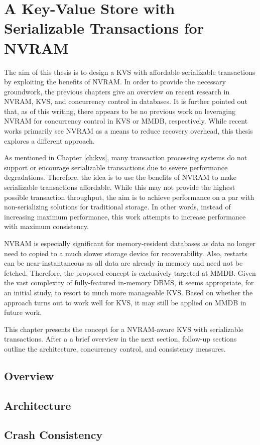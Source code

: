 \chapter{A Key-Value Store with Serializable Transactions for NVRAM}
\label{ch:concept}

The aim of this thesis is to design a KVS with affordable serializable
transactions by exploiting the benefits of NVRAM. In order to provide the
necessary groundwork, the previous chapters give an overview on recent research
in NVRAM, KVS, and concurrency control in databases. It is further pointed out
that, as of this writing, there appears to be no previous work on leveraging
NVRAM for concurrency control in KVS or MMDB, respectively. While recent works
primarily see NVRAM as a means to reduce recovery overhead, this thesis explores
a different approach.

As mentioned in Chapter \ref{ch:kvs}, many transaction processing systems do not
support or encourage serializable transactions due to severe performance
degradations. Therefore, the idea is to use the benefits of NVRAM to make
serializable transactions affordable. While this may not provide the highest
possible transaction throughput, the aim is to achieve performance on a par with
non-serializing solutions for traditional storage. In other words, instead of
increasing maximum performance, this work attempts to increase performance with
maximum consistency.

NVRAM is especially significant for memory-resident databases as data no longer
need to copied to a much slower storage device for recoverability. Also,
restarts can be near-instantaneous as all data are already in memory and need
not be fetched. Therefore, the proposed concept is exclusively targeted at MMDB.
Given the vast complexity of fully-featured in-memory DBMS, it seems
appropriate, for an initial study, to resort to much more manageable KVS. Based
on whether the approach turns out to work well for KVS, it may still be applied
on MMDB in future work.

This chapter presents the concept for a NVRAM-aware KVS with serializable
transactions. After a a brief overview in the next section, follow-up sections
outline the architecture, concurrency control, and consistency measures.

\section{Overview}
\label{ch:concept-overview}


\section{Architecture}
\label{ch:concept-arch}



\section{Crash Consistency}
\label{ch:concept-consistency}

